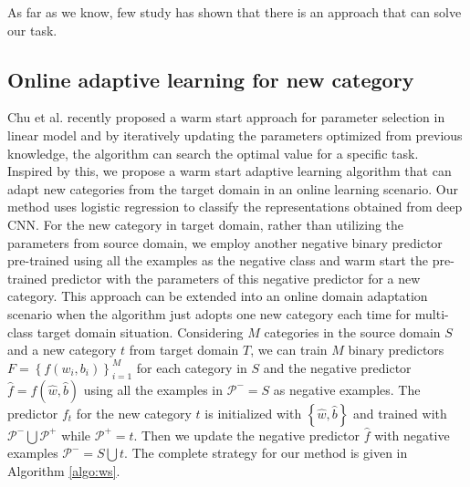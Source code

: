 As far as we know, few study has shown that there is an approach that can solve our task.
\subsection{Online adaptive learning for new category}
Chu et al. recently proposed a warm start approach for parameter selection in linear model and by iteratively updating the parameters optimized from previous knowledge, the algorithm can search the optimal value for a specific task\cite{chuwarm}. Inspired by this, we propose a warm start adaptive learning algorithm that can adapt new categories from the target domain in an online learning scenario. Our method uses logistic regression to classify the representations obtained from deep CNN. For the new category in target domain, rather than utilizing the parameters from source domain, we employ another negative binary predictor pre-trained using all the examples as the negative class and warm start the pre-trained predictor with the parameters of this negative predictor for a new category. This approach can be extended into an online domain adaptation scenario when the algorithm just adopts one new category each time for multi-class target domain situation. Considering $M$ categories in the source domain $S$ and a new category $t$ from target domain $T$, we can train $M$ binary predictors $F=\left\{ {{f}\left( {{w_i},{b_i}} \right)} \right\}_{i = 1}^M$ for each category in $S$ and the negative predictor $\hat{f}=f(\hat{w},\hat{b})$ using all the examples in $\mathcal{P^-}=S$ as negative examples. The predictor $f_t$ for the new category $t$ is initialized with $\left\{\hat{w},\hat{b}\right\}$ and trained with $\mathcal{P^-}\bigcup\mathcal{P^+}$ while $\mathcal{P^+}=t$. Then we update the negative predictor $\hat{f}$ with negative examples $\mathcal{P^-}=S\bigcup t$. The complete strategy for our method is given in Algorithm \ref{algo:ws}.
